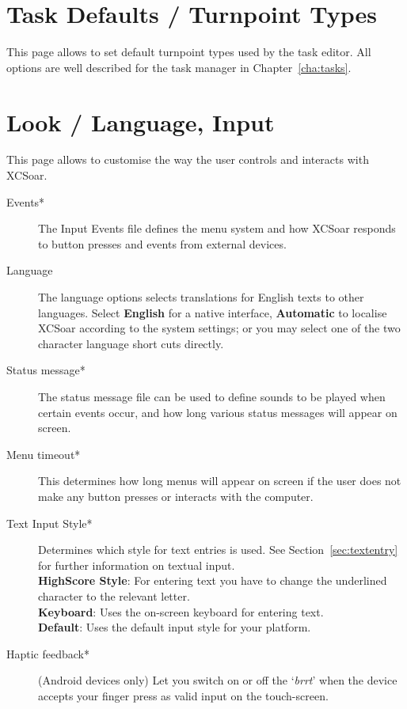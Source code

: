 \section{Task Defaults / Turnpoint Types}

This page allows to set default turnpoint types used by the task editor. All 
options are well described for the task manager in Chapter~\ref{cha:tasks}.


\section{Look / Language, Input}\label{sec:interface}

This page allows to customise the way the user controls and interacts with
XCSoar.

\begin{description}
\item[Events*]  The Input Events file defines the menu system and how XCSoar
  responds to button presses and events from external devices.
\item[Language]  The language options selects translations for English texts to
  other languages.  Select {\bf English} for a native interface, {\bf Automatic}
  to localise XCSoar according to the system settings; or you may select one of 
  the two character language short cuts directly.
\item[Status message*]  The status message file can be used to define sounds to 
  be played when certain events occur, and how long various status messages will 
  appear on screen.
\item[Menu timeout*]  This determines how long menus will appear on screen if the user
  does not make any button presses or interacts with the computer.
\item[Text Input Style*]  Determines which style for text entries is used. 
  See Section~\ref{sec:textentry} for further information on textual input. \\
  {\bf HighScore Style}: For entering text you have to change the underlined 
  character to the relevant letter. \\
  {\bf Keyboard}: Uses the on-screen keyboard for entering text. \\
  {\bf Default}: Uses the default input style for your platform.
\item[Haptic feedback*]  (Android devices only) Let you switch on or off the `{\it brrt}' 
  when the device accepts your finger press as valid input on the touch-screen.
\end{description}

